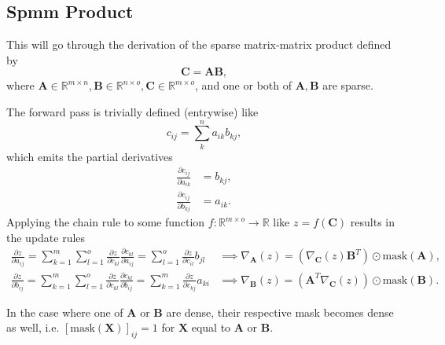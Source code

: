 \documentclass{article}
\newcommand{\mat}[1]{\bm{{#1}}}
\newcommand{\mask}[1]{\text{mask}\left( {#1} \right)}
\newcommand{\gradfn}[2]{\nabla_{{#1}}\left({#2}\right)} %
\theoremstyle{definition}
\begin{document}
\subsection{Spmm Product}
This will go through the derivation of the sparse matrix-matrix product defined by
\begin{equation}
  \mat{C} = \mat{A}\mat{B},
\end{equation}
where $\mat{A} \in \mathbb{R}^{m \times n}, \mat{B} \in \mathbb{R}^{n \times o}, \mat{C} \in \mathbb{R}^{m \times o}$, and one or both of $\mat{A}, \mat{B}$ are sparse.

The forward pass is trivially defined (entrywise) like
\begin{equation}
  c_{ij} = \sum_k^n a_{ik} b_{kj},
\end{equation}
which emits the partial derivatives
\begin{align}
  \frac{\partial c_{ij}}{\partial a_{ik}} &= b_{kj}, \\
  \frac{\partial c_{ij}}{\partial b_{kj}} &= a_{ik}.
\end{align}
Applying the chain rule to some function $f : \mathbb{R}^{m \times o} \to \mathbb{R}$ like $z=f\left(\mat{C}\right)$ results in the update rules
\begin{align}
  \frac{\partial z}{\partial a_{ij}} = \sum_{k=1}^m \sum_{l=1}^o \frac{\partial z}{\partial c_{kl}} \frac{\partial c_{kl}}{\partial a_{ij}} = \sum_{l=1}^o \frac{\partial z}{\partial c_{il}} b_{jl} &\implies \gradfn{\mat{A}}{z} = \left(\gradfn{\mat{C}}{z} \mat{B}^T\right) \odot \mask{\mat{A}}, \\
  \frac{\partial z}{\partial b_{ij}} = \sum_{k=1}^m \sum_{l=1}^o \frac{\partial z}{\partial c_{kl}} \frac{\partial c_{kl}}{\partial b_{ij}} = \sum_{k=1}^m \frac{\partial z}{\partial c_{kj}} a_{ki} &\implies \gradfn{\mat{B}}{z} = \left(\mat{A}^T \gradfn{\mat{C}}{z}\right) \odot \mask{\mat{B}}.
\end{align}

In the case where one of $\mat{A}$ or $\mat{B}$ are dense, their respective mask becomes dense as well, i.e. $\left[\mask{\mat{X}}\right]_{ij}=1$ for $\mat{X}$ equal to $\mat{A}$ or $\mat{B}$.
\end{document}
